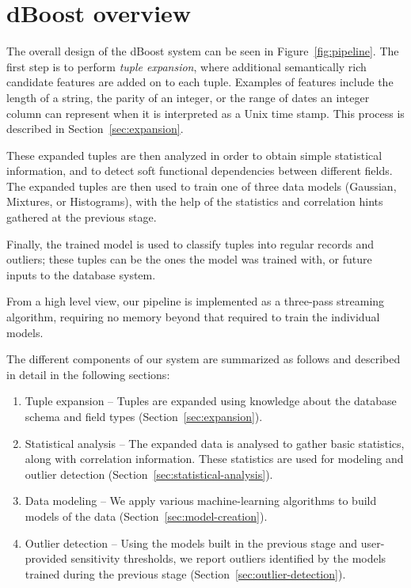 \section{dBoost overview}
\label{sec:overview}

\begin{figure*}
  \centering %
  \caption{The \dBoost/ pipeline}
  \label{fig:pipeline}
\end{figure*}

The overall design of the dBoost system can be seen in Figure~\ref{fig:pipeline}.
The first step is to perform \emph{tuple expansion}, where additional semantically rich candidate features are added on to each tuple.
Examples of features include the length of a string, the parity of an integer, or the range of dates an integer column can represent when it is interpreted as a Unix time stamp. This process is described in Section~\ref{sec:expansion}.

These expanded tuples are then analyzed in order to obtain simple statistical information, and to detect soft functional dependencies between different fields. The expanded tuples are then used to train one of three data models (Gaussian, Mixtures, or Histograms), with the help of the statistics and correlation hints gathered at the previous stage.

Finally, the trained model is used to classify tuples into regular records and outliers; these tuples can be the ones the model was trained with, or future inputs to the database system.

From a high level view, our pipeline is implemented as a three-pass streaming algorithm, requiring no memory beyond that required to train the individual models.

The different components of our system are summarized as follows and described in detail in the following sections:

\begin{enumerate}
\item Tuple expansion -- Tuples are expanded using knowledge about the database schema and field types (Section~\ref{sec:expansion}).
\item Statistical analysis -- The expanded data is analysed to gather basic statistics, along with correlation information. These statistics are used for modeling and outlier detection (Section~\ref{sec:statistical-analysis}).
\item Data modeling -- We apply various machine-learning algorithms to build models of the data (Section~\ref{sec:model-creation}).
\item Outlier detection -- Using the models built in the previous stage and user-provided sensitivity thresholds, we report outliers identified by the models trained during the previous stage (Section~\ref{sec:outlier-detection}).
\end{enumerate}

